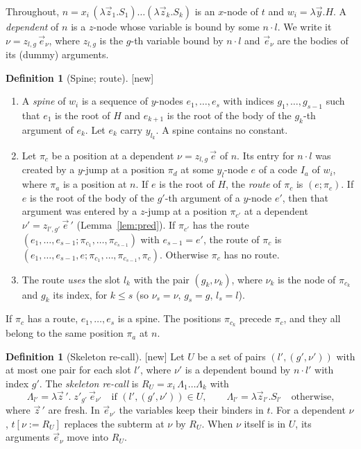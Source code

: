 \documentclass[11pt]{article}
\newcommand{\suc}[2]{#1{\cdot}#2}
\newcommand{\New}{\textsf{[new]}}
\theoremstyle{plain}
\theoremstyle{definition}
\newtheorem{definition}[theorem]{Definition}
\theoremstyle{remark}
\begin{document}
Throughout, $n=x_i\,(\lambda\vec z_1.S_1)\dots(\lambda\vec z_k.S_k)$ is
an $x$-node of $t$ and $w_i=\lambda\vec y.H$.  A \emph{dependent} of $n$
is a $z$-node whose variable is bound by some $\suc nl$.  We write it
$\nu=z_{l,g}\,\vec e_\nu$, where $z_{l,g}$ is the $g$-th variable bound
by $\suc nl$ and $\vec e_\nu$ are the bodies of its (dummy) arguments.

\begin{definition}[Spine; route]\label{def:route}
\New{}
\begin{enumerate}
\item A \emph{spine} of $w_i$ is a sequence of $y$-nodes $e_1,\dots,e_s$
  with indices $g_1,\dots,g_{s-1}$ such that $e_1$ is the root of $H$ and
  $e_{k+1}$ is the root of the body of the $g_k$-th argument of $e_k$.
  Let $e_k$ carry $y_{l_k}$.  A spine contains no constant.
\item Let $\pi_c$ be a position at a dependent $\nu=z_{l,g}\,\vec e$ of
  $n$.  Its entry for $\suc nl$ was created by a $y$-jump at a position
  $\pi_d$ at some $y_l$-node $e$ of a code $I_a$ of $w_i$, where $\pi_a$
  is a position at $n$.  If $e$ is the root of $H$, the \emph{route} of
  $\pi_c$ is $(e;\pi_c)$.  If $e$ is the root of the body of the $g'$-th
  argument of a $y$-node $e'$, then that argument was entered by a
  $z$-jump at a position $\pi_{c'}$ at a dependent
  $\nu'=z_{l',g'}\,\vec e\,'$ (Lemma~\ref{lem:pred}).  If $\pi_{c'}$ has
  the route $(e_1,\dots,e_{s-1};\pi_{c_1},\dots,\pi_{c_{s-1}})$ with
  $e_{s-1}=e'$, the route of $\pi_c$ is $(e_1,\dots,e_{s-1},e;\pi_{c_1},
  \dots,\pi_{c_{s-1}},\pi_c)$.  Otherwise $\pi_c$ has no route.
\item The route \emph{uses} the slot $l_k$ with the pair $(g_k,\nu_k)$,
  where $\nu_k$ is the node of $\pi_{c_k}$ and $g_k$ its index, for
  $k\le s$ (so $\nu_s=\nu$, $g_s=g$, $l_s=l$).
\end{enumerate}
\end{definition}

If $\pi_c$ has a route, $e_1,\dots,e_s$ is a spine.  The positions
$\pi_{c_k}$ precede $\pi_c$, and they all belong to the same position
$\pi_a$ at $n$.

\begin{definition}[Skeleton re-call]\label{def:skeleton}
\New{} Let $U$ be a set of pairs $(l',(g',\nu'))$ with at most one pair
for each slot $l'$, where $\nu'$ is a dependent bound by $\suc n{l'}$
with index $g'$.  The \emph{skeleton re-call} is
$R_U=x_i\,\Lambda_1\dots\Lambda_k$ with
\[
\Lambda_{l'}=\lambda\vec z\,'.\;z'_{g'}\,\vec e_{\nu'}\quad\text{if }(l',(g',\nu'))\in U,
\qquad
\Lambda_{l'}=\lambda\vec z_{l'}.S_{l'}\quad\text{otherwise,}
\]
where $\vec z\,'$ are fresh.  In $\vec e_{\nu'}$ the variables keep their
binders in $t$.  For a dependent $\nu$, $t[\nu:=R_U]$ replaces the
subterm at $\nu$ by $R_U$.  When $\nu$ itself is in $U$, its arguments
$\vec e_\nu$ move into $R_U$.
\end{definition}
\end{document}
